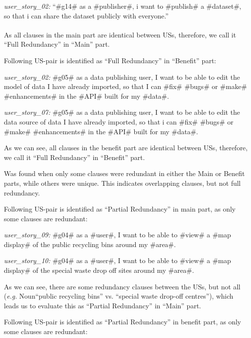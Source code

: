 \begin{itemize}
\begin{example}
		\textit{user\_story\_02:} \enquote{\#g14\# as a \#publisher\#, i want to \#publish\# a \#dataset\#, so that i can share the dataset publicly with everyone.}\\\\
		 As all clauses in the main part are identical between USs, therefore, we call it \enquote{Full Redundancy} in \enquote{Main} part.
	\end{example}
	\begin{example}
		Following US-pair is identified as \enquote{Full Redundancy} in \enquote{Benefit} part:
		
		\textit{user\_story\_02:} \#g05\# as a data publishing user, I want to be able to edit the model of data I have already imported, so that I can \#fix\# \#bugs\# or \#make\# \#enhancements\# in the \#API\# built for my \#data\#.
		
		\textit{user\_story\_07:} \#g05\# as a data publishing user, I want to be able to edit the data source of data I have already imported, so that i can \#fix\# \#bugs\# or \#make\# \#enhancements\# in the \#API\# built for my \#data\#.
		
		As we can see, all clauses in the benefit part are identical between USs, therefore, we call it \enquote{Full Redundancy} in \enquote{Benefit} part.
	\end{example}
	\begin{definition}
		Was found when only some clauses were redundant in either the Main or Benefit parts, while others were unique. This indicates overlapping clauses, but not full redundancy.
	\end{definition}
	\begin{example}
		Following US-pair is identified as \enquote{Partial Redundancy} in main part, as only some clauses are redundant:
		
		\textit{user\_story\_09:} \#g04\# as a \#user\#, I want to be able to \#view\# a \#map display\# of the public recycling bins around my \#area\#.
		
		\textit{user\_story\_10:} \#g04\# as a \#user\#, I want to be able to \#view\# a \#map display\# of the special waste drop off sites around my \#area\#.
		
		As we can see, there are some redundancy clauses between the USs, but not all (\textit{e.g.} Noun\enquote{public recycling bins} vs. \enquote{special waste drop-off centres}), which leads us to evaluate this as \enquote{Partial Redundancy} in \enquote{Main} part.
	\end{example}
	\begin{example}
	Following US-pair is identified as \enquote{Partial Redundancy} in benefit part, as only some clauses are redundant:
	

\end{example}
\end{itemize}
